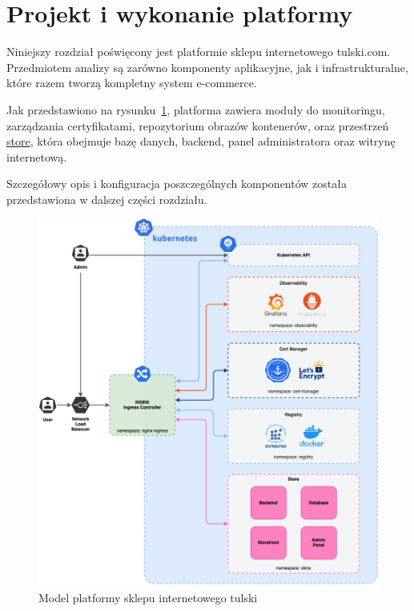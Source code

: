 \newpage

\section{Projekt i wykonanie platformy}\label{sec:projekt-platformy}

Niniejszy rozdział poświęcony jest platformie sklepu internetowego tulski.com.
Przedmiotem analizy są zarówno komponenty aplikacyjne, jak i infrastrukturalne, które razem tworzą kompletny system e-commerce.

Jak przedstawiono na rysunku~\ref{fig:platform-model}, platforma zawiera moduły do monitoringu, zarządzania certyfikatami, repozytorium obrazów kontenerów, oraz przestrzeń \url{store}, która obejmuje bazę danych, backend, panel administratora oraz witrynę internetową.

Szczegółowy opis i konfiguracja poszczególnych komponentów została przedstawiona w dalszej części rozdziału.

\begin{figure}[p]
    \centering
    \includegraphics[width=\textwidth]{img/main-infra-model}
    \caption{Model platformy sklepu internetowego tulski}
    \label{fig:platform-model}
\end{figure}

